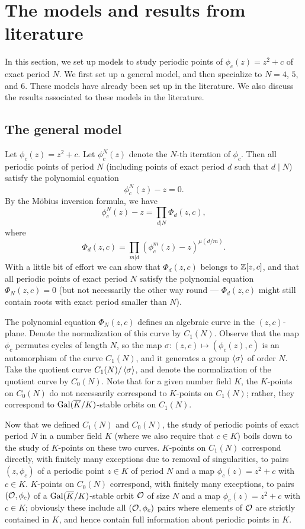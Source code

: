 \section{The models and results from literature}
\label{sec:model}

In this section, we set up models to study periodic points of
$\phi_c(z) = z^2 + c$ of exact period $N$. We first set up a general
model, and then specialize to $N = 4$, $5$, and $6$. These models have
already been set up in the literature. We also discuss the results
associated to these models in the literature.

\subsection{The general model}
\label{subsec:model-general}

Let $\phi_c(z) = z^2 + c$. Let $\phi_c^N(z)$ denote the $N$-th
iteration of $\phi_c$. Then all periodic points of period $N$
(including points of exact period $d$ such that $d \mid N$) satisfy
the polynomial equation
\[
\phi_c^N(z) - z = 0.
\]
By the M\"obius inversion formula, we have
\[
\phi_c^N(z) - z = \prod_{d|N} \Phi_d(z, c),
\]
where
\[
\Phi_d(z, c) = \prod_{m|d}(\phi_c^m(z) - z)^{\mu(d/m)}.
\]
With a little bit of effort we can show that $\Phi_d(z, c)$ belongs to
$\mathbb{Z}[z, c]$, and that all periodic points of exact period $N$ satisfy
the polynomial equation $\Phi_N(z, c) = 0$ (but not necessarily the
other way round --- $\Phi_d(z, c)$ might still contain roots with
exact period smaller than $N$).

The polynomial equation $\Phi_N(z, c)$ defines an algebraic curve in
the $(z, c)$-plane. Denote the normalization of this curve by
$C_1(N)$. Observe that the map $\phi_c$ permutes cycles of length $N$,
so the map $\sigma: (z, c) \mapsto (\phi_c(z), c)$ is an automorphism
of the curve $C_1(N)$, and it generates a group $\left<\sigma\right>$ of
order $N$. Take the quotient curve $C_1(N)/\left<\sigma\right>$, and denote
the normalization of the quotient curve by $C_0(N)$. Note that for a
given number field $K$, the $K$-points on $C_0(N)$ do not necessarily
correspond to $K$-points on $C_1(N)$; rather, they correspond to
$\mathrm{Gal}(\overline{K}/K)$-stable orbits on $C_1(N)$.

Now that we defined $C_1(N)$ and $C_0(N)$, the study of periodic
points of exact period $N$ in a number field $K$ (where we also
require that $c \in K$) boils down to the study of $K$-points on these
two curves. $K$-points on $C_1(N)$ correspond directly, with finitely
many exceptions due to removal of singularities, to pairs $(z,
\phi_c)$ of a periodic point $z \in K$ of period $N$ and a map
$\phi_c(z) = z^2 + c$ with $c \in K$. $K$-points on $C_0(N)$
correspond, with finitely many exceptions, to pairs $(\mathcal{O}, \phi_c)$ of
a $\mathrm{Gal}(\overline{K}/K)$-stable orbit $\mathcal{O}$ of size $N$ and a map $\phi_c(z)
= z^2 + c$ with $c \in K$; obviously these include all $(\mathcal{O}, \phi_c)$
pairs where elements of $\mathcal{O}$ are strictly contained in $K$, and hence
contain full information about periodic points in $K$.

